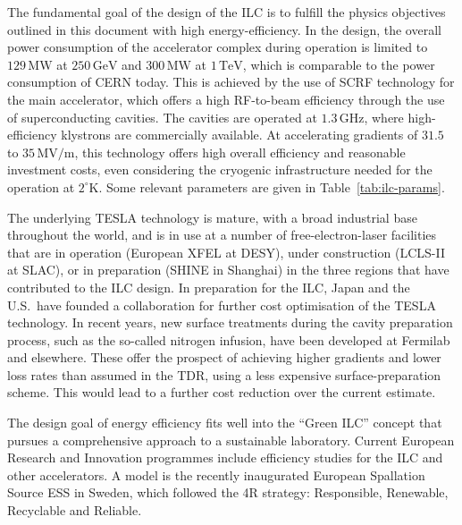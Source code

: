 \documentclass[%
 reprint,
 amsmath,amssymb,
 aps,
]{revtex4-1}
\begin{document}
The fundamental goal of the design of the ILC is to fulfill the
physics objectives outlined in this document  with high energy-efficiency.  In the design,
the overall power consumption of the accelerator complex during operation is limited to $129\,{\mathrm{MW}}$ at  $250\,{\mathrm{GeV}}$ and $300\,{\mathrm{MW}}$ at  $1\,{\mathrm{TeV}}$, which is comparable to the power consumption of CERN today.
This is achieved by the use of SCRF technology for the main
accelerator, which offers a high RF-to-beam efficiency through the use
of superconducting cavities.  The cavities are operated at 
 $1.3\,{\mathrm{GHz}}$, where high-efficiency klystrons are commercially available.
At accelerating gradients of $31.5$ to $35\,{\mathrm{MV/m}}$, this
technology offers high overall efficiency and reasonable investment
costs, even considering the cryogenic infrastructure needed for the
operation 
at $2^\circ{\mathrm{K}}$. Some relevant parameters are given in Table~\ref{tab:ilc-params}.

The underlying TESLA technology is mature, with a broad industrial
base throughout the world, and is in use at a number of free-electron-laser
facilities that are in operation (European XFEL at DESY), under construction (LCLS-II at SLAC),
 or in preparation (SHINE in Shanghai) in the three regions that have
 contributed to the ILC design. In preparation for the ILC, Japan and
 the U.S.\ 
have founded a collaboration for further cost optimisation of the TESLA technology.
In recent years, new surface treatments during the cavity preparation
process, such as the so-called nitrogen infusion, have been 
developed at Fermilab and elsewhere.
These offer the prospect of  achieving  higher gradients and lower loss
rates than
assumed in the TDR, using a less expensive surface-preparation scheme.
This  would lead to a
 further cost reduction over
the current
 estimate.
 
 The design goal of energy efficiency fits well into the ``Green ILC'' concept \cite{GreenILC} that pursues a comprehensive approach to a sustainable laboratory.  Current European Research and Innovation programmes include
 efficiency studies for the ILC and other accelerators. 
A model is the recently inaugurated European Spallation Source ESS in Sweden, which followed the 4R strategy: Responsible, Renewable, Recyclable and Reliable.
\end{document}
